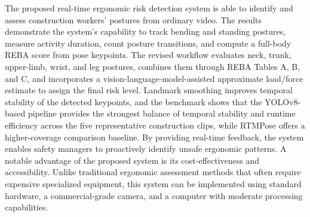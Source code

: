 \documentclass[11pt]{article}
\begin{document}
The proposed real-time ergonomic risk detection system is able to identify and assess construction workers' postures from ordinary video. The results demonstrate the system's capability to track bending and standing postures, measure activity duration, count posture transitions, and compute a full-body REBA score from pose keypoints. The revised workflow evaluates neck, trunk, upper-limb, wrist, and leg postures, combines them through REBA Tables A, B, and C, and incorporates a vision-language-model-assisted approximate load/force estimate to assign the final risk level. Landmark smoothing improves temporal stability of the detected keypoints, and the benchmark shows that the YOLOv8-based pipeline provides the strongest balance of temporal stability and runtime efficiency across the five representative construction clips, while RTMPose offers a higher-coverage comparison baseline. By providing real-time feedback, the system enables safety managers to proactively identify unsafe ergonomic patterns. A notable advantage of the proposed system is its cost-effectiveness and accessibility. Unlike traditional ergonomic assessment methods that often require expensive specialized equipment, this system can be implemented using standard hardware, a commercial-grade camera, and a computer with moderate processing capabilities.




\end{document}

